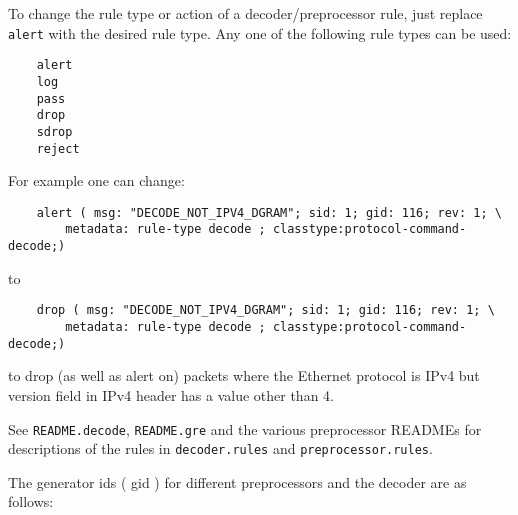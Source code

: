 \documentclass[english]{report}
\begin{document}
To change the rule type or action of a decoder/preprocessor rule, just replace
\texttt{alert} with the desired rule type.  Any one of the following rule types
can be used:

\begin{verbatim}
    alert
    log
    pass
    drop
    sdrop
    reject
\end{verbatim}

For example one can change:

\begin{verbatim}
    alert ( msg: "DECODE_NOT_IPV4_DGRAM"; sid: 1; gid: 116; rev: 1; \
        metadata: rule-type decode ; classtype:protocol-command-decode;)
\end{verbatim}

to

\begin{verbatim}
    drop ( msg: "DECODE_NOT_IPV4_DGRAM"; sid: 1; gid: 116; rev: 1; \
        metadata: rule-type decode ; classtype:protocol-command-decode;)
\end{verbatim}

to drop (as well as alert on) packets where the Ethernet protocol is IPv4 but
version field in IPv4 header has a value other than 4.

See \texttt{README.decode}, \texttt{README.gre} and the various preprocessor
READMEs for descriptions of the rules in \texttt{decoder.rules} and
\texttt{preprocessor.rules}.

The generator ids ( gid ) for different preprocessors and the decoder are as follows:
\end{document}
